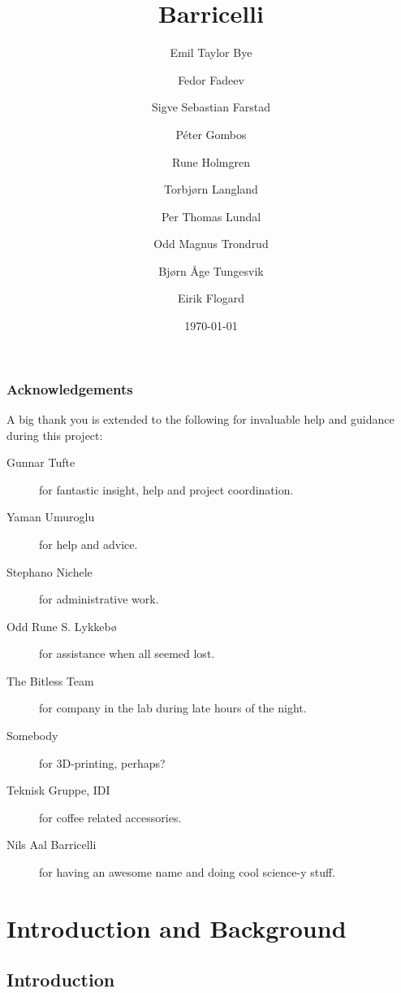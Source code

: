 \documentclass[a4paper]{report}
\title{Barricelli}
\date{\today}
\author{Emil Taylor Bye
     \and Fedor Fadeev
     \and Sigve Sebastian Farstad
     \and Péter Gombos
     \and Rune Holmgren
     \and Torbjørn Langland
     \and Per Thomas Lundal
     \and Odd Magnus Trondrud
     \and Bjørn Åge Tungesvik
     \and Eirik Flogard
}
\begin{document}



\newpage
\thispagestyle{empty}
\mbox{}
\newpage

\begin{abstract}
	
\end{abstract}

\thispagestyle{empty}
\section*{Acknowledgements}
A big thank you is extended to the following for invaluable help and guidance during this project:

\begin{description}
\item[Gunnar Tufte] for fantastic insight, help and project coordination.
\item[Yaman Umuroglu] for help and advice.
\item[Stephano Nichele] for administrative work.
\item[Odd Rune S. Lykkebø] for assistance when all seemed lost.
\item[The Bitless Team] for company in the lab during late hours of the night.
\item[Somebody] for 3D-printing, perhaps? 
\item[Teknisk Gruppe, IDI] for coffee related accessories.
\item[Nils Aal Barricelli] for having an awesome name and doing cool science-y stuff.
\end{description}

\setcounter{page}{3}

\tableofcontents
\newpage

\listoffigures
\listoftables
\listofalgorithms
\renewcommand{\lstlistlistingname}{List of Listings}

\newpage
\setcounter{page}{1}

\part{Introduction and Background}

\chapter{Introduction}
	
\end{document}
